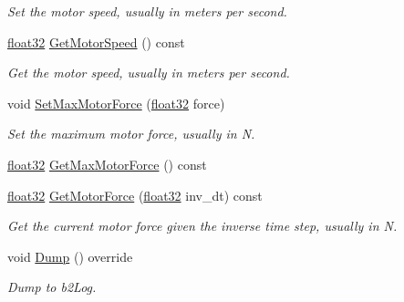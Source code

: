 \begin{DoxyCompactItemize}
\begin{DoxyCompactList}\small\item\em Set the motor speed, usually in meters per second. \end{DoxyCompactList}\item 
\mbox{\hyperlink{b2_settings_8h_aacdc525d6f7bddb3ae95d5c311bd06a1}{float32}} \mbox{\hyperlink{classb2_prismatic_joint_a869c6edeb62ed01237b2adb09da273ae}{Get\+Motor\+Speed}} () const
\begin{DoxyCompactList}\small\item\em Get the motor speed, usually in meters per second. \end{DoxyCompactList}\item 
void \mbox{\hyperlink{classb2_prismatic_joint_aa7817474aef15ca4815341479ac590e2}{Set\+Max\+Motor\+Force}} (\mbox{\hyperlink{b2_settings_8h_aacdc525d6f7bddb3ae95d5c311bd06a1}{float32}} force)
\begin{DoxyCompactList}\small\item\em Set the maximum motor force, usually in N. \end{DoxyCompactList}\item 
\mbox{\hyperlink{b2_settings_8h_aacdc525d6f7bddb3ae95d5c311bd06a1}{float32}} \mbox{\hyperlink{classb2_prismatic_joint_aea8d0701bdf00a38fd2f24d94ae74842}{Get\+Max\+Motor\+Force}} () const
\item 
\mbox{\hyperlink{b2_settings_8h_aacdc525d6f7bddb3ae95d5c311bd06a1}{float32}} \mbox{\hyperlink{classb2_prismatic_joint_aaf7a7fe2300d9fe7a810306e9cfbb41a}{Get\+Motor\+Force}} (\mbox{\hyperlink{b2_settings_8h_aacdc525d6f7bddb3ae95d5c311bd06a1}{float32}} inv\+\_\+dt) const
\begin{DoxyCompactList}\small\item\em Get the current motor force given the inverse time step, usually in N. \end{DoxyCompactList}\item 
void \mbox{\hyperlink{classb2_prismatic_joint_a843ddb0f912085f3deb3ee7320d7ddc7}{Dump}} () override
\begin{DoxyCompactList}\small\item\em Dump to b2\+Log. \end{DoxyCompactList}\end{DoxyCompactItemize}
